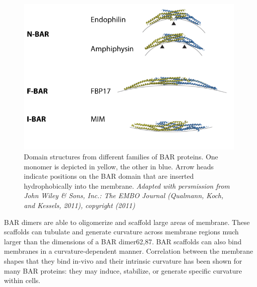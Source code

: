 \vspace{2mm}

\begin{figure}[H]
	\centering
	\includegraphics[scale=0.5]{figures/intro/BAR_structures}
		\caption[Structures of BAR domain dimers]{Domain structures from different families of BAR proteins. One monomer is depicted in yellow, the other in blue. Arrow heads indicate positions on the BAR domain that are inserted hydrophobically into the membrane. \textit{Adapted with persmission from John Wiley \& Sons, Inc.: The EMBO Journal (Qualmann, Koch, and Kessels, 2011), copyright (2011)}
		\label{bar_structures}}
\end{figure}

\newpage
\vspace{5mm}
BAR dimers are able to oligomerize and scaffold large areas of membrane. These scaffolds can tubulate and generate curvature across membrane regions much larger than the dimensions of a BAR dimer62,87. BAR scaffolds can also bind membranes in a curvature-dependent manner. Correlation between the membrane shapes that they bind in-vivo and their intrinsic curvature has been shown for many BAR proteins: they may induce, stabilize, or generate specific curvature within cells. 

